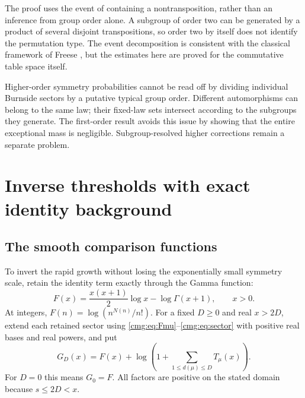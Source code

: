 \documentclass[11pt,letterpaper]{article}
\numberwithin{equation}{section}
\theoremstyle{definition}\newtheorem{definition}[theorem]{Definition}
\theoremstyle{remark}\newtheorem{remark}[theorem]{Remark}
\begin{document}
The proof uses the event of containing a nontransposition, rather than an inference from group order alone. A subgroup of order two can be generated by a product of several disjoint transpositions, so order two by itself does not identify the permutation type. The event decomposition is consistent with the classical framework of Freese \cite{freese}, but the estimates here are proved for the commutative table space itself.

Higher-order symmetry probabilities cannot be read off by dividing individual Burnside sectors by a putative typical group order. Different automorphisms can belong to the same law; their fixed-law sets intersect according to the subgroups they generate. The first-order result avoids this issue by showing that the entire exceptional mass is negligible. Subgroup-resolved higher corrections remain a separate problem.

\section{Inverse thresholds with exact identity background}\label{cmg:sec:inverse}
\subsection{The smooth comparison functions}
To invert the rapid growth without losing the exponentially small symmetry scale, retain the identity term exactly through the Gamma function:
\begin{equation}\label{cmg:eq:F}
 F(x)=\frac{x(x+1)}2\log x-\log\Gamma(x+1),\qquad x>0.
\end{equation}
At integers, $F(n)=\log(n^{N(n)}/n!)$. For a fixed $D\ge0$ and real $x>2D$, extend each retained sector using \eqref{cmg:eq:Fmu}--\eqref{cmg:eq:sector} with positive real bases and real powers, and put
\begin{equation}\label{cmg:eq:GD}
 G_D(x)=F(x)+\log\left(1+\sum_{1\le d(\mu)\le D}T_\mu(x)\right).
\end{equation}
For $D=0$ this means $G_0=F$. All factors are positive on the stated domain because $s\le2D<x$.
\end{document}
